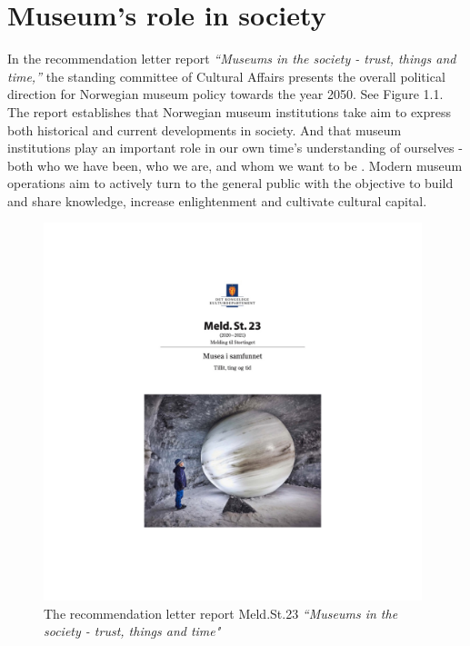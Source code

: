 \section{Museum's role in society}
In the recommendation letter report \emph{“Museums in the society - trust, things and time,”} the standing committee of Cultural Affairs presents the overall political direction for Norwegian museum policy towards the year 2050. See Figure 1.1. The report establishes that Norwegian museum institutions take aim to express both historical and current developments in society. And that museum institutions play an important role in our own time’s understanding of ourselves - both who we have been, who we are, and whom we want to be \autocite[p. 7]{melding23}. Modern museum operations aim to actively turn to the general public with the objective to build and share knowledge, increase enlightenment and cultivate cultural capital.

\begin{figure}[H]
\includegraphics[width=11cm]{pictures/stortingsmelding.jpg}
\caption{The recommendation letter report Meld.St.23 \emph{“Museums in the society - trust, things and time"}}
\centering 
\end{figure}

